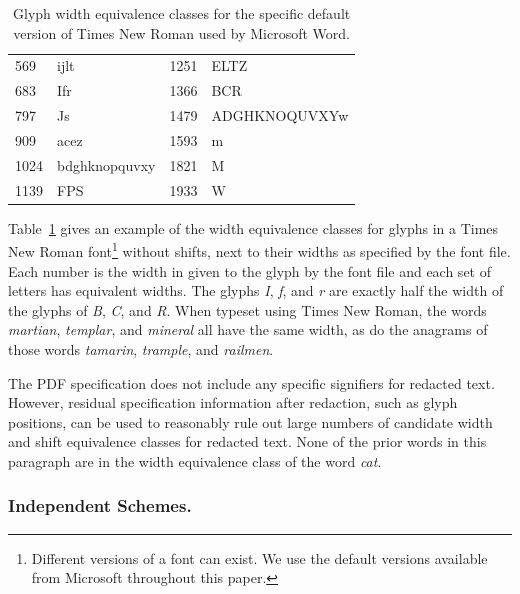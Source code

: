 \begin{table}\centering
\caption{Glyph width equivalence classes for the specific default version of
    Times New Roman used by Microsoft Word.}
\label{tab:tnr-glyph-widths}
\small
\begin{tabular}{@{\quad}ll@{\quad\quad\quad}ll}
569 & ijlt & 1251 & ELTZ \\
683 & Ifr & 1366 & BCR \\
797 & Js & 1479 & ADGHKNOQUVXYw \\
909 & acez & 1593 & m \\
1024 & bdghknopquvxy & 1821 & M \\
1139 & FPS & 1933 & W
\end{tabular}
\end{table}

Table~\ref{tab:tnr-glyph-widths} gives an example of the width equivalence classes for glyphs in a Times New Roman font\footnote{
    Different versions of a font can exist. 
    We use the default versions available from Microsoft throughout this paper.
} without shifts, next to their widths as specified by the font file.
Each number is the width in given to the glyph by the font file and each set of letters has equivalent widths.
The glyphs \emph{I}, \emph{f}, and \emph{r} are exactly half the width of the glyphs of \emph{B}, \emph{C}, and \emph{R}. 
When typeset using Times New Roman, the words \emph{martian}, \emph{templar}, and \emph{mineral} all have the same width, as do the anagrams of those words \emph{tamarin}, \emph{trample}, and \emph{railmen}.

The PDF specification does not include any specific signifiers for redacted text.
However, residual specification information after redaction, such as glyph positions, can be used to reasonably rule out large numbers of candidate width and shift equivalence classes for redacted text.
None of the prior words in this paragraph are in the width equivalence class of the word \emph{cat}.

\subsubsection{Independent Schemes.}
\label{sec:gdocs}
\label{sec:adobe-ocr}

